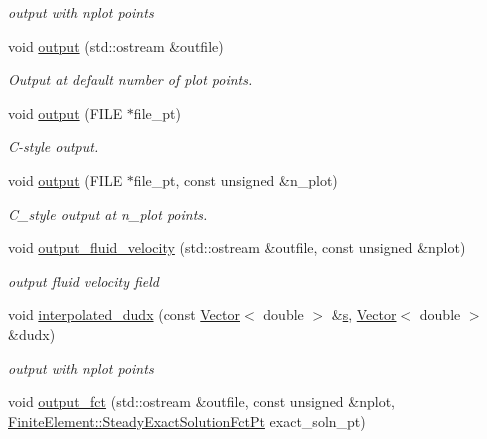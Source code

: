 \begin{DoxyCompactItemize}
\begin{DoxyCompactList}\small\item\em output with nplot points \end{DoxyCompactList}\item 
void \hyperlink{classoomph_1_1BiharmonicEquations_a2e34f7e115f4e80d5ef6fcbed78c97d7}{output} (std\+::ostream \&outfile)
\begin{DoxyCompactList}\small\item\em Output at default number of plot points. \end{DoxyCompactList}\item 
void \hyperlink{classoomph_1_1BiharmonicEquations_aab220ac5f1da0181b400b2b360889229}{output} (F\+I\+LE $\ast$file\+\_\+pt)
\begin{DoxyCompactList}\small\item\em C-\/style output. \end{DoxyCompactList}\item 
void \hyperlink{classoomph_1_1BiharmonicEquations_af0fa36f6c36da7cfaf8f28f3609a0c6c}{output} (F\+I\+LE $\ast$file\+\_\+pt, const unsigned \&n\+\_\+plot)
\begin{DoxyCompactList}\small\item\em C\+\_\+style output at n\+\_\+plot points. \end{DoxyCompactList}\item 
void \hyperlink{classoomph_1_1BiharmonicEquations_a1aa52e23ab7e609c21d97728e9a8f2ce}{output\+\_\+fluid\+\_\+velocity} (std\+::ostream \&outfile, const unsigned \&nplot)
\begin{DoxyCompactList}\small\item\em output fluid velocity field \end{DoxyCompactList}\item 
void \hyperlink{classoomph_1_1BiharmonicEquations_a911cb37a410977a094a81dedd8bfcf6d}{interpolated\+\_\+dudx} (const \hyperlink{classoomph_1_1Vector}{Vector}$<$ double $>$ \&\hyperlink{cfortran_8h_ab7123126e4885ef647dd9c6e3807a21c}{s}, \hyperlink{classoomph_1_1Vector}{Vector}$<$ double $>$ \&dudx)
\begin{DoxyCompactList}\small\item\em output with nplot points \end{DoxyCompactList}\item 
void \hyperlink{classoomph_1_1BiharmonicEquations_aca4e6ea18f47696a4535dfc4e020ee64}{output\+\_\+fct} (std\+::ostream \&outfile, const unsigned \&nplot, \hyperlink{classoomph_1_1FiniteElement_a690fd33af26cc3e84f39bba6d5a85202}{Finite\+Element\+::\+Steady\+Exact\+Solution\+Fct\+Pt} exact\+\_\+soln\+\_\+pt)

\end{DoxyCompactItemize}
